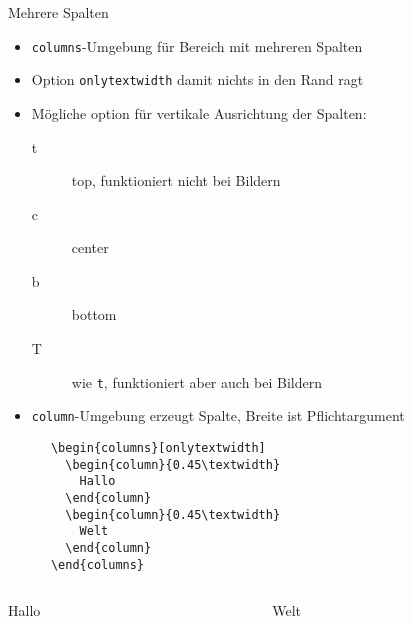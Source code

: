 \begin{BeamerCodeFrame}[fragile]{Mehrere Spalten}
  \begin{itemize}
    \item \texttt{columns}-Umgebung für Bereich mit mehreren Spalten
    \item Option \texttt{onlytextwidth} damit nichts in den Rand ragt
    \item Mögliche option für vertikale Ausrichtung der Spalten:
      \begin{description}
        \item[t] top, funktioniert nicht bei Bildern
        \item[c] center
        \item[b] bottom
        \item[T] wie \texttt{t}, funktioniert aber auch bei Bildern
      \end{description}
    \item \texttt{column}-Umgebung erzeugt Spalte, Breite ist Pflichtargument
  \end{itemize}
  \begin{CodeExample}{0.5}
    \begin{verbatim}
      \begin{columns}[onlytextwidth]
        \begin{column}{0.45\textwidth}
          Hallo
        \end{column}
        \begin{column}{0.45\textwidth}
          Welt
        \end{column}
      \end{columns}
    \end{verbatim}
  \CodeResult
    \begin{columns}[onlytextwidth]
      \begin{column}{0.45\textwidth}
        Hallo
      \end{column}
      \begin{column}{0.45\textwidth}
        Welt
      \end{column}
    \end{columns}
  \end{CodeExample}
\end{BeamerCodeFrame}

